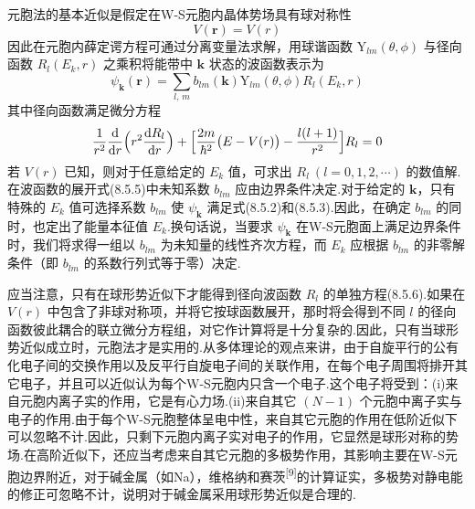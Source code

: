 元胞法的基本近似是假定在W-S元胞内晶体势场具有球对称性
\begin{equation}
  V(\boldsymbol{r})=V(r)
\end{equation}
因此在元胞内薛定谔方程可通过分离变量法求解，用球谐函数 $\mathrm{Y}_{lm}(\theta,\phi)$ 与径向函数 $R_{l}(E_{k},r)$ 之乘积将能带中 $\boldsymbol{k}$ 状态的波函数表示为
\begin{equation}
  \psi_{\boldsymbol{k}}(\boldsymbol{r})=\sum_{l,\,m}b_{lm}(\boldsymbol{k})\mathrm{Y}_{lm}(\theta,\phi)R_{l}(E_{k},r)
\end{equation}
其中径向函数满足微分方程
\begin{equation}
  \frac{1}{r^{2}}\frac{\mathrm{d}}{\mathrm{d}r}\Bigl(r^{2}\frac{\mathrm{d}R_{l}}{\mathrm{d}r}\Bigr)
  +\Bigl[\frac{2m}{\hbar^{2}}\bigl(E-V(r)\bigr)-\frac{l(l+1)}{r^{2}}\Bigr]R_{l}=0
\end{equation}
若 $V(r)$ 已知，则对于任意给定的 $E_{k}$ 值，可求出 $R_{l}\ (l=0,1,2,\cdots)$ 的数值解.在波函数的展开式(8.5.5)中未知系数 $b_{lm}$ 应由边界条件决定.对于给定的 $\boldsymbol{k}$，只有特殊的 $E_{k}$ 值可选择系数 $b_{lm}$ 使 $\psi_{\boldsymbol{k}}$ 满足式(8.5.2)和(8.5.3).因此，在确定 $b_{lm}$ 的同时，也定出了能量本征值 $E_{k}$.换句话说，当要求 $\psi_{\boldsymbol{k}}$ 在W-S元胞面上满足边界条件时，我们将求得一组以 $b_{lm}$ 为未知量的线性齐次方程，而 $E_{k}$ 应根据 $b_{lm}$ 的非零解条件（即 $b_{lm}$ 的系数行列式等于零）决定.

应当注意，只有在球形势近似下才能得到径向波函数 $R_{l}$ 的单独方程(8.5.6).如果在 $V(r)$ 中包含了非球对称项，并将它按球函数展开，那时将会得到不同 $l$ 的径向函数彼此耦合的联立微分方程组，对它作计算将是十分复杂的.因此，只有当球形势近似成立时，元胞法才是实用的.从多体理论的观点来讲，由于自旋平行的公有化电子间的交换作用以及反平行自旋电子间的关联作用，在每个电子周围将排开其它电子，并且可以近似认为每个W-S元胞内只含一个电子.这个电子将受到：(i)来自元胞内离子实的作用，它是有心力场.(ii)来自其它 $(N-1)$ 个元胞中离子实与电子的作用.由于每个W-S元胞整体呈电中性，来自其它元胞的作用在低阶近似下可以忽略不计.因此，只剩下元胞内离子实对电子的作用，它显然是球形对称的势场.在高阶近似下，还应当考虑来自其它元胞的多极势作用，其影响主要在W-S元胞边界附近，对于碱金属（如Na），维格纳和赛茨\textsuperscript{[9]}的计算证实，多极势对静电能的修正可忽略不计，说明对于碱金属采用球形势近似是合理的.

